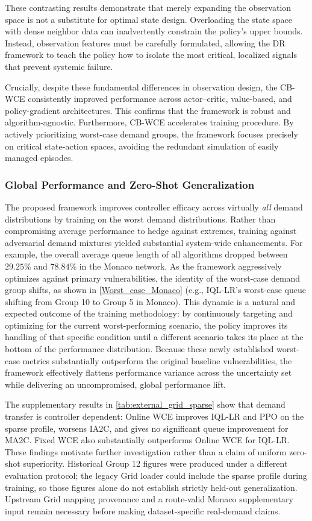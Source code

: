 \documentclass[lettersize,journal]{IEEEtran}
\begin{document}
These contrasting results demonstrate that merely expanding the observation space is not a substitute for optimal state design. Overloading the state space with dense neighbor data can inadvertently constrain the policy's upper bounds. Instead, observation features must be carefully formulated, allowing the DR framework to teach the policy how to isolate the most critical, localized signals that prevent systemic failure.

Crucially, despite these fundamental differences in observation design, the CB-WCE consistently improved performance across actor--critic, value-based, and policy-gradient architectures. This confirms that the framework is robust and algorithm-agnostic. Furthermore, CB-WCE accelerates training procedure. By actively prioritizing worst-case demand groups, the framework focuses precisely on critical state-action spaces, avoiding the redundant simulation of easily managed episodes.

\subsubsection{Global Performance and Zero-Shot Generalization}
The proposed framework improves controller efficacy across virtually \textit{all} demand distributions by training on the worst demand distributions. Rather than compromising average performance to hedge against extremes, training against adversarial demand mixtures yielded substantial system-wide enhancements. For example, the overall average queue length of all algorithms dropped between $29.25\%$ and $78.84\%$ in the Monaco network.
As the framework aggressively optimizes against primary vulnerabilities, the identity of the worst-case demand group shifts, as shown in \cref{Worst_case_Monaco} (e.g., IQL-LR's worst-case queue shifting from Group 10 to Group 5 in Monaco). This dynamic is a natural and expected outcome of the training methodology: by continuously targeting and optimizing for the current worst-performing scenario, the policy improves its handling of that specific condition until a different scenario takes its place at the bottom of the performance distribution. Because these newly established worst-case metrics substantially outperform the original baseline vulnerabilities, the framework effectively flattens performance variance across the uncertainty set while delivering an uncompromised, global performance lift.

The supplementary results in \cref{tab:external_grid_sparse} show that demand transfer is controller dependent: Online WCE improves IQL-LR and PPO on the sparse profile, worsens IA2C, and gives no significant queue improvement for MA2C. Fixed WCE also substantially outperforms Online WCE for IQL-LR. These findings motivate further investigation rather than a claim of uniform zero-shot superiority. Historical Group 12 figures were produced under a different evaluation protocol; the legacy Grid loader could include the sparse profile during training, so those figures alone do not establish strictly held-out generalization. Upstream Grid mapping provenance and a route-valid Monaco supplementary input remain necessary before making dataset-specific real-demand claims.
\end{document}
